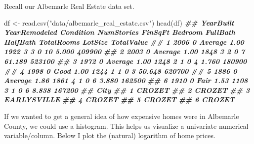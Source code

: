 \documentclass[
  12pt,
  krantz2]{krantz}
\makeatletter
\newenvironment{Shaded}{\begin{snugshade}}{\end{snugshade}}
\newcommand{\AttributeTok}[1]{\textcolor[rgb]{0.61,0.61,0.61}{#1}}
\newcommand{\DocumentationTok}[1]{\textcolor[rgb]{0.37,0.37,0.37}{\textbf{\textit{#1}}}}
\newcommand{\FunctionTok}[1]{\textcolor[rgb]{0,0,0}{#1}}
\newcommand{\NormalTok}[1]{#1}
\newcommand{\OtherTok}[1]{\textcolor[rgb]{0.37,0.37,0.37}{#1}}
\newcommand{\SpecialCharTok}[1]{\textcolor[rgb]{0,0,0}{#1}}
\newcommand{\StringTok}[1]{\textcolor[rgb]{0.5,0.5,0.5}{#1}}
\newenvironment{kframe}{%
\medskip{}
\setlength{\fboxsep}{.8em}
 \def\at@end@of@kframe{}%
 \ifinner\ifhmode%
  \def\at@end@of@kframe{\end{minipage}}%
  \begin{minipage}{\columnwidth}%
 \fi\fi%
 \def\FrameCommand##1{\hskip\@totalleftmargin \hskip-\fboxsep
 \colorbox{shadecolor}{##1}\hskip-\fboxsep
     \hskip-\linewidth \hskip-\@totalleftmargin \hskip\columnwidth}%
 \MakeFramed {\advance\hsize-\width
   \@totalleftmargin\z@ \linewidth\hsize
   \@setminipage}}%
 {\par\unskip\endMakeFramed%
 \at@end@of@kframe}
\renewenvironment{Shaded}{\begin{kframe}}{\end{kframe}}
\makeatother
\begin{document}
Recall our Albemarle Real Estate data set.

\begin{Shaded}
\begin{Highlighting}[]
\NormalTok{df }\OtherTok{\textless{}{-}} \FunctionTok{read.csv}\NormalTok{(}\StringTok{"data/albemarle\_real\_estate.csv"}\NormalTok{)}
\FunctionTok{head}\NormalTok{(df)}
\DocumentationTok{\#\#   YearBuilt YearRemodeled Condition NumStories FinSqFt Bedroom FullBath HalfBath TotalRooms LotSize TotalValue}
\DocumentationTok{\#\# 1      2006             0   Average       1.00    1922       3        3        0         10   5.000     409900}
\DocumentationTok{\#\# 2      2003             0   Average       1.00    1848       3        2        0          7  61.189     523100}
\DocumentationTok{\#\# 3      1972             0   Average       1.00    1248       2        1        0          4   1.760     180900}
\DocumentationTok{\#\# 4      1998             0      Good       1.00    1244       1        1        0          3  50.648     620700}
\DocumentationTok{\#\# 5      1886             0   Average       1.86    1861       4        1        0          6   3.880     162500}
\DocumentationTok{\#\# 6      1910             0      Fair       1.53    1108       3        1        0          6   8.838     167200}
\DocumentationTok{\#\#          City}
\DocumentationTok{\#\# 1      CROZET}
\DocumentationTok{\#\# 2      CROZET}
\DocumentationTok{\#\# 3 EARLYSVILLE}
\DocumentationTok{\#\# 4      CROZET}
\DocumentationTok{\#\# 5      CROZET}
\DocumentationTok{\#\# 6      CROZET}
\end{Highlighting}
\end{Shaded}

If we wanted to get a general idea of how expensive homes were in Albemarle County, we could use a histogram. This helps us visualize a univariate numerical variable/column. Below I plot the (natural) logarithm of home prices.

\begin{Shaded}
\end{Shaded}
\end{document}
